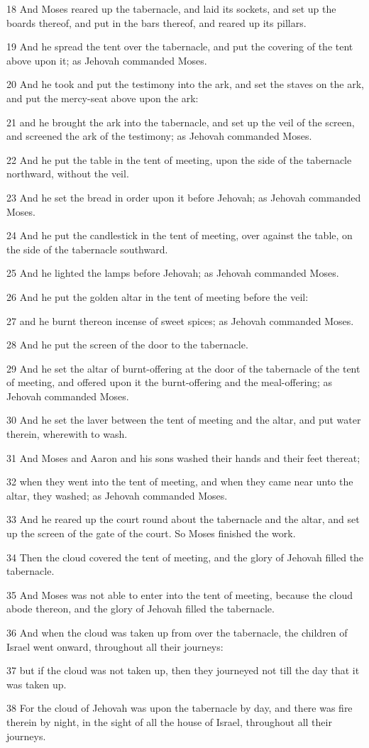 \par 18 And Moses reared up the tabernacle, and laid its sockets, and set up the boards thereof, and put in the bars thereof, and reared up its pillars.
\par 19 And he spread the tent over the tabernacle, and put the covering of the tent above upon it; as Jehovah commanded Moses.
\par 20 And he took and put the testimony into the ark, and set the staves on the ark, and put the mercy-seat above upon the ark:
\par 21 and he brought the ark into the tabernacle, and set up the veil of the screen, and screened the ark of the testimony; as Jehovah commanded Moses.
\par 22 And he put the table in the tent of meeting, upon the side of the tabernacle northward, without the veil.
\par 23 And he set the bread in order upon it before Jehovah; as Jehovah commanded Moses.
\par 24 And he put the candlestick in the tent of meeting, over against the table, on the side of the tabernacle southward.
\par 25 And he lighted the lamps before Jehovah; as Jehovah commanded Moses.
\par 26 And he put the golden altar in the tent of meeting before the veil:
\par 27 and he burnt thereon incense of sweet spices; as Jehovah commanded Moses.
\par 28 And he put the screen of the door to the tabernacle.
\par 29 And he set the altar of burnt-offering at the door of the tabernacle of the tent of meeting, and offered upon it the burnt-offering and the meal-offering; as Jehovah commanded Moses.
\par 30 And he set the laver between the tent of meeting and the altar, and put water therein, wherewith to wash.
\par 31 And Moses and Aaron and his sons washed their hands and their feet thereat;
\par 32 when they went into the tent of meeting, and when they came near unto the altar, they washed; as Jehovah commanded Moses.
\par 33 And he reared up the court round about the tabernacle and the altar, and set up the screen of the gate of the court. So Moses finished the work.
\par 34 Then the cloud covered the tent of meeting, and the glory of Jehovah filled the tabernacle.
\par 35 And Moses was not able to enter into the tent of meeting, because the cloud abode thereon, and the glory of Jehovah filled the tabernacle.
\par 36 And when the cloud was taken up from over the tabernacle, the children of Israel went onward, throughout all their journeys:
\par 37 but if the cloud was not taken up, then they journeyed not till the day that it was taken up.
\par 38 For the cloud of Jehovah was upon the tabernacle by day, and there was fire therein by night, in the sight of all the house of Israel, throughout all their journeys.

